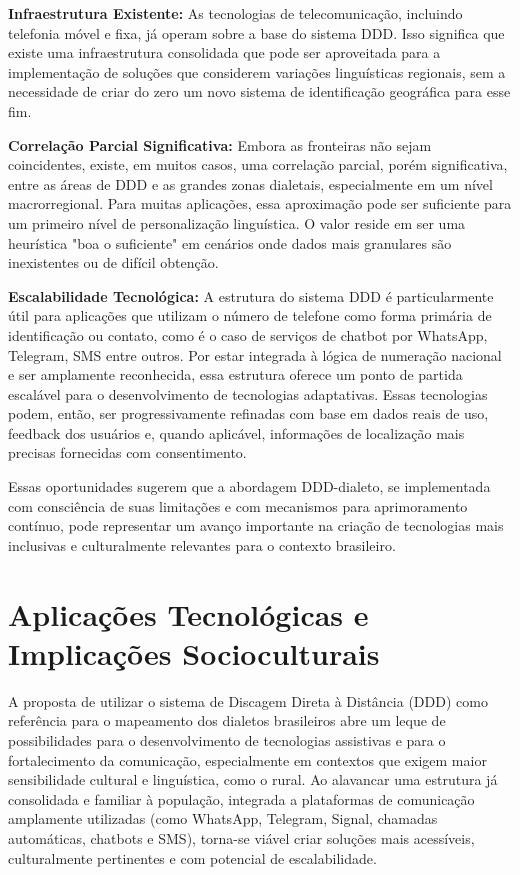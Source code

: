 \textbf{Infraestrutura Existente:} As tecnologias de telecomunicação, incluindo telefonia móvel e fixa, já operam sobre a base do sistema DDD. Isso significa que existe uma infraestrutura consolidada que pode ser aproveitada para a implementação de soluções que considerem variações linguísticas regionais, sem a necessidade de criar do zero um novo sistema de identificação geográfica para esse fim.

\textbf{Correlação Parcial Significativa:} Embora as fronteiras não sejam coincidentes, existe, em muitos casos, uma correlação parcial, porém significativa, entre as áreas de DDD e as grandes zonas dialetais, especialmente em um nível macrorregional. Para muitas aplicações, essa aproximação pode ser suficiente para um primeiro nível de personalização linguística. O valor reside em ser uma heurística "boa o suficiente" em cenários onde dados mais granulares são inexistentes ou de difícil obtenção.

\textbf{Escalabilidade Tecnológica:} A estrutura do sistema DDD é particularmente útil para aplicações que utilizam o número de telefone como forma primária de identificação ou contato, como é o caso de serviços de chatbot por WhatsApp, Telegram, SMS entre outros. Por estar integrada à lógica de numeração nacional e ser amplamente reconhecida, essa estrutura oferece um ponto de partida escalável para o desenvolvimento de tecnologias adaptativas. Essas tecnologias podem, então, ser progressivamente refinadas com base em dados reais de uso, feedback dos usuários e, quando aplicável, informações de localização mais precisas fornecidas com consentimento.

Essas oportunidades sugerem que a abordagem DDD-dialeto, se implementada com consciência de suas limitações e com mecanismos para aprimoramento contínuo, pode representar um avanço importante na criação de tecnologias mais inclusivas e culturalmente relevantes para o contexto brasileiro.

\section{Aplicações Tecnológicas e Implicações Socioculturais}


A proposta de utilizar o sistema de Discagem Direta à Distância (DDD) como referência para o mapeamento dos dialetos brasileiros abre um leque de possibilidades para o desenvolvimento de tecnologias assistivas e para o fortalecimento da comunicação, especialmente em contextos que exigem maior sensibilidade cultural e linguística, como o rural. Ao alavancar uma estrutura já consolidada e familiar à população, integrada a plataformas de comunicação amplamente utilizadas (como WhatsApp, Telegram, Signal, chamadas automáticas, chatbots e SMS), torna-se viável criar soluções mais acessíveis, culturalmente pertinentes e com potencial de escalabilidade.

